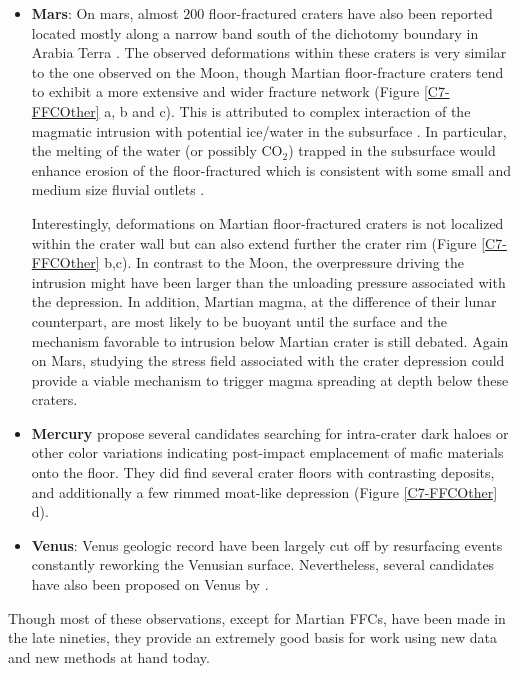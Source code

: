 \begin{itemize}
\item  \textbf{Mars}: On  mars, almost  $200$ floor-fractured  craters
  have also been reported located mostly  along a narrow band south of
  the dichotomy  boundary in Arabia Terra  \citep{Bamberg:2014hb}. The
  observed deformations  within these craters  is very similar  to the
  one observed on the Moon, though Martian floor-fracture craters tend
  to  exhibit a  more  extensive and  wider  fracture network  (Figure
  \ref{C7-FFCOther}  a,  b  and  c). This  is  attributed  to  complex
  interaction of  the magmatic  intrusion with potential  ice/water in
  the  subsurface  \citep{Sato:2010ex,Bamberg:2014hb}. In  particular,
  the  melting  of the  water  (or  possibly  CO$_2$) trapped  in  the
  subsurface  would enhance  erosion of  the floor-fractured  which is
  consistent  with   some  small  and  medium   size  fluvial  outlets
  \citep{Sato:2010ex}.

  Interestingly,  deformations on  Martian floor-fractured  craters is
  not localized within the crater wall but can also extend further the
  crater rim (Figure \ref{C7-FFCOther} b,c).  In contrast to the Moon,
  the overpressure driving  the intrusion might have  been larger than
  the unloading pressure associated  with the depression. In addition,
  Martian magma,  at the  difference of  their lunar  counterpart, are
  most  likely to  be  buoyant  until the  surface  and the  mechanism
  favorable to intrusion below Martian  crater is still debated. Again
  on  Mars,  studying the  stress  field  associated with  the  crater
  depression  could  provide  a  viable  mechanism  to  trigger  magma
  spreading at depth below these craters.

\item   \textbf{Mercury}    \citet{Schultz:1977ec}   propose   several
  candidates  searching for  intra-crater dark  haloes or  other color
  variations  indicating post-impact  emplacement  of mafic  materials
  onto the floor. They did find several crater floors with contrasting
  deposits, and additionally a few rimmed moat-like depression (Figure
  \ref{C7-FFCOther} d).

\item \textbf{Venus}: Venus geologic record  have been largely cut off
  by  resurfacing events  constantly reworking  the Venusian  surface.
  Nevertheless, several candidates have also been proposed on Venus by
  \citet{Wichman:1995ju}.
\end{itemize}

Though most of these observations,  except for Martian FFCs, have been
made in  the late nineties, they  provide an extremely good  basis for
work using new data and new methods at hand today.










      

